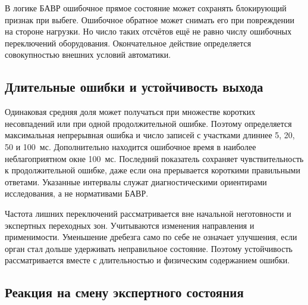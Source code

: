{}

В логике БАВР ошибочное прямое состояние
может сохранять блокирующий признак при выбеге.
Ошибочное обратное может снимать его
при повреждении на стороне нагрузки.
Но число таких отсчётов ещё не равно числу
ошибочных переключений оборудования.
Окончательное действие определяется
совокупностью внешних условий автоматики.

\subsection{Длительные ошибки и устойчивость выхода}

Одинаковая средняя доля может получаться
при множестве коротких несовпадений
или при одной продолжительной ошибке.
Поэтому определяется максимальная непрерывная ошибка
и число записей с участками длиннее
5, 20, 50 и 100~мс.
Дополнительно находится ошибочное время
в наиболее неблагоприятном окне 100~мс.
Последний показатель сохраняет чувствительность
к продолжительной ошибке, даже если она
прерывается короткими правильными ответами.
Указанные интервалы служат диагностическими
ориентирами исследования, а не нормативами БАВР.

{}

Частота лишних переключений рассматривается
вне начальной неготовности и экспертных переходных зон.
Учитываются изменения направления
и применимости. Уменьшение дребезга само по себе
не означает улучшения, если орган стал дольше
удерживать неправильное состояние.
Поэтому устойчивость рассматривается вместе
с длительностью и физическим содержанием ошибки.

\subsection{Реакция на смену экспертного состояния}

